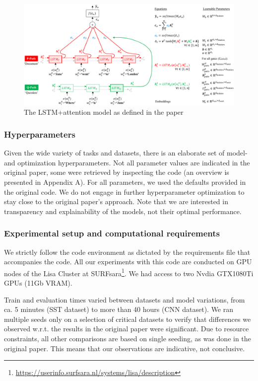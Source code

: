 \begin{figure}[h!]
\centering
\includegraphics[width=1.0\linewidth]{./figures/model_arch_cropped_.pdf}
\caption{The LSTM+attention model as defined in the paper}
\label{fig:model_arch}
\end{figure}

\subsubsection{Hyperparameters}
Given the wide variety of tasks and datasets, there is an elaborate set of model- and optimization hyperparameters. Not all parameter values are indicated in the original paper, some were retrieved by inspecting the code (an overview is presented in Appendix A). For all parameters, we used the defaults provided in the original code. We do not engage in further hyperparameter optimization to stay close to the original paper's approach. Note that we are interested in transparency and explainability of the models, not their optimal performance.  

\subsubsection{Experimental setup and computational requirements}
We strictly follow the code environment as dictated by the requirements file that accompanies the code. All our experiments with this code are conducted on GPU nodes of the Lisa Cluster at SURFsara\footnote{\url{https://userinfo.surfsara.nl/systems/lisa/description}}. We had access to two Nvdia GTX1080Ti GPUs (11Gb VRAM). 

Train and evaluation times varied between datasets and model variations, from ca. 5 minutes (SST dataset) to more than 40 hours (CNN dataset). We ran multiple seeds only on a selection of critical datasets to verify that differences we observed w.r.t. the results in the original paper were significant. Due to resource constraints, all other comparisons are based on single seeding, as was done in the original paper. This means that our observations are indicative, not conclusive.

